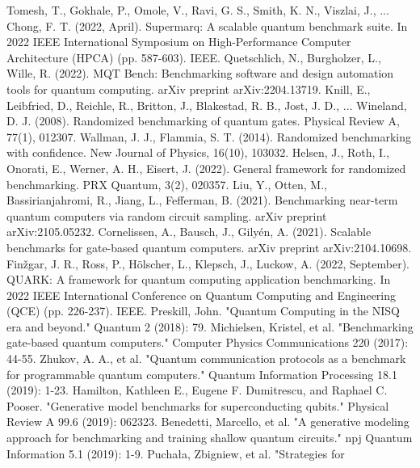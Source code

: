 \documentclass[preprint,12pt, a4paper, dvipsnames]{elsarticle}
\newcommand{\1}{{\rm 1\hspace{-0.9mm}l}}
\begin{document}
\begin{thebibliography}{00}
	 Tomesh, T., Gokhale, P., Omole, V., Ravi, G. S., Smith, K. N., Viszlai, J., ...  Chong, F. T. (2022, April). Supermarq: A scalable quantum benchmark suite. In 2022 IEEE International Symposium on High-Performance Computer Architecture (HPCA) (pp. 587-603). IEEE.
	 Quetschlich, N., Burgholzer, L., Wille, R. (2022). MQT Bench: Benchmarking software and design automation tools for quantum computing. arXiv preprint arXiv:2204.13719.
	 Knill, E., Leibfried, D., Reichle, R., Britton, J., Blakestad, R. B., Jost, J. D., ... Wineland, D. J. (2008). Randomized benchmarking of quantum gates. Physical Review A, 77(1), 012307.
	 Wallman, J. J.,  Flammia, S. T. (2014). Randomized benchmarking with confidence. New Journal of Physics, 16(10), 103032.
	 Helsen, J., Roth, I., Onorati, E., Werner, A. H.,  Eisert, J. (2022). General framework for randomized benchmarking. PRX Quantum, 3(2), 020357.
  	Liu, Y., Otten, M., Bassirianjahromi, R., Jiang, L.,  Fefferman, B. (2021). Benchmarking near-term quantum computers via random circuit sampling. arXiv preprint arXiv:2105.05232.
 Cornelissen, A., Bausch, J.,  Gilyén, A. (2021). Scalable benchmarks for gate-based quantum computers. arXiv preprint arXiv:2104.10698.
 Finžgar, J. R., Ross, P., Hölscher, L., Klepsch, J.,  Luckow, A. (2022, September). QUARK: A framework for quantum computing application benchmarking. In 2022 IEEE International Conference on Quantum Computing and Engineering (QCE) (pp. 226-237). IEEE.
 Preskill, John. "Quantum Computing in the NISQ era and
beyond." Quantum 2 (2018): 79.
 Michielsen, Kristel, et al. "Benchmarking
gate-based quantum computers." Computer Physics Communications 220 (2017):
44-55.
 Zhukov, A. A., et al. "Quantum communication
protocols as a benchmark for programmable quantum computers." Quantum
Information Processing 18.1 (2019): 1-23.
 Hamilton, Kathleen E., Eugene F. Dumitrescu,
and Raphael C. Pooser. "Generative model benchmarks for superconducting
qubits." Physical Review A 99.6 (2019): 062323.
 Benedetti, Marcello, et al. "A generative
modeling approach for benchmarking and training shallow quantum circuits." npj
Quantum Information 5.1 (2019): 1-9.
 Puchała, Zbigniew, et al. "Strategies for

\end{thebibliography}
\end{document}
